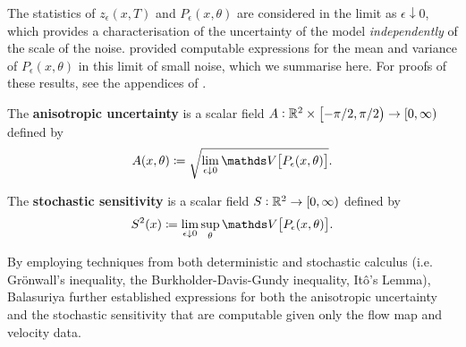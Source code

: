 The statistics of \(z_\epsilon\left(x,T\right)\) and \(P_\epsilon(x,\theta)\) are considered in the limit as \(\epsilon\downarrow 0\), which provides a characterisation of the uncertainty of the model \emph{independently} of the scale of the noise.
\citet{Balasuriya_2020_StochasticSensitivityComputable} provided computable expressions for the mean and variance of \(P_\epsilon\left(x,\theta\right)\) in this limit of small noise, which we summarise here.
For proofs of these results, see the appendices of \citet{Balasuriya_2020_StochasticSensitivityComputable}.

\begin{definition}
	\begin{alpharate}
		\item The \textbf{anisotropic uncertainty} is a scalar field \(A: \mathbb{R}^2\times\left[-\pi/2, \pi/2\right) \to [0,\infty)\) defined by
		\[
			A(x,\theta) \coloneqq \sqrt{\lim_{\epsilon\downarrow 0}\var{P_\epsilon(x,\theta)}}.
		\]

		\item The \textbf{stochastic sensitivity} is a scalar field \(S: \mathbb{R}^2 \to [0,\infty)\) defined by
		\[
			S^2(x) \coloneqq \lim_{\epsilon\downarrow 0}\sup_{\theta}{\var{P_\epsilon(x,\theta)}}.
		\]
	\end{alpharate}
\end{definition}

By employing techniques from both deterministic and stochastic calculus (i.e. Gr\"onwall's inequality, the Burkholder-Davis-Gundy inequality, It\^o's Lemma), Balasuriya further established expressions for both the anisotropic uncertainty and the stochastic sensitivity that are computable given only the flow map and velocity data.

